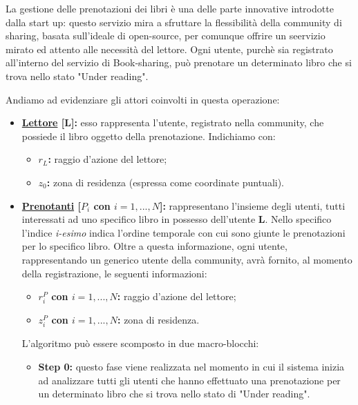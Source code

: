 La gestione delle prenotazioni dei libri è una delle parte innovative introdotte dalla start up: questo servizio mira a sfruttare la flessibilità della community di sharing, basata sull'ideale di open-source, per comunque offrire un seervizio mirato ed attento alle necessità del lettore.
Ogni utente, purchè sia registrato all'interno del servizio di Book-sharing, può prenotare un determinato libro che si trova nello stato "Under reading".

Andiamo ad evidenziare gli attori coinvolti in questa operazione:
\begin{itemize}
	\item \textbf{\underline{Lettore} [L]:} esso rappresenta l'utente, registrato nella community, che possiede il libro oggetto della prenotazione. Indichiamo con:
	\begin{itemize}
		\item \textbf{{\LARGE $r_{L}$}:} raggio d'azione del lettore;
		\item \textbf{{\LARGE $ z_{0} $}:} zona di residenza (espressa come coordinate puntuali).
	\end{itemize}
	\item \textbf{\underline{Prenotanti} [$ P_{i}$ con $i=1,...,N $]:} rappresentano l'insieme degli utenti, tutti interessati ad uno specifico libro in possesso dell'utente \textbf{L}.
	Nello specifico l'indice \textit{i-esimo} indica l'ordine temporale con cui sono giunte le prenotazioni per lo specifico libro.
	Oltre a questa informazione, ogni utente, rappresentando un generico utente della community, avrà fornito, al momento della registrazione, le seguenti informazioni:
	\begin{itemize}
		\item \textbf{{\LARGE $r^{P}_{i}$} con $i=1,...,N $:} raggio d'azione del lettore;
		\item \textbf{{\LARGE $z^{P}_{i}$} con $i=1,...,N $:} zona di residenza.
	\end{itemize}

	L'algoritmo può essere scomposto in due macro-blocchi:
	\begin{itemize}
		\item \textbf{Step 0:} questo fase viene realizzata nel momento in cui il sistema inizia ad analizzare tutti gli utenti che hanno effettuato una prenotazione per un determinato libro che si trova nello stato di "Under reading".
		

\end{itemize}
\end{itemize}

